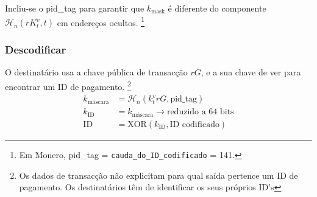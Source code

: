 Incliu-se o pid\_tag para garantir que $k_{\textrm{mask}}$ é diferente do componente $\mathcal{H}_n(r K_t^v, t)$ em endereços ocultos.
\footnote{Em Monero, pid\_tag = {\tt cauda\_do\_ID\_codificado} = 141.}


\subsubsection*{Descodificar}

O destinatário usa a chave pública de transacção $r G$, e a sua chave de ver para encontrar um ID de pagamento.
\footnote{Os dados de transacção não explicitam para qual saída pertence um ID de pagamento. Os destinatários têm de identificar os seus próprios ID's}
\vspace{.175cm}
\begin{align*}
         k_{\textrm{máscara}} &= \mathcal{H}_n(k_t^v r G,\textrm{pid\_tag}) \\
      k_{\textrm{ID}} &= k_{\textrm{máscara}} \rightarrow \textrm{reduzido a 64 bits}\\
          \textrm{ID} &= \textrm{XOR}(k_{\textrm{ID}}, \textrm{ID codificado})
\end{align*}


\iffalse

\section{Endereços de multi-assinatura}
\label{sec:multisignature-addresses}

Ás vezes é útil partilhar a posse de fundos entre várias pessoas/endereços. O capítulo \ref{chapter:multisignatures} é dedicado a este tópico.
\fi
